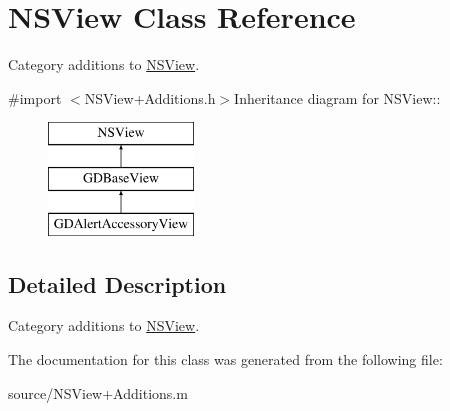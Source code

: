 \hypertarget{class_n_s_view}{
\section{NSView Class Reference}
\label{class_n_s_view}
}


Category additions to \hyperlink{class_n_s_view}{NSView}.  


{\ttfamily \#import $<$NSView+Additions.h$>$}Inheritance diagram for NSView::\begin{figure}[H]
\begin{center}
\leavevmode
\includegraphics[height=3cm]{class_n_s_view}
\end{center}
\end{figure}


\subsection{Detailed Description}
Category additions to \hyperlink{class_n_s_view}{NSView}. 

The documentation for this class was generated from the following file:\begin{DoxyCompactItemize}
\item 
source/NSView+Additions.m\end{DoxyCompactItemize}
